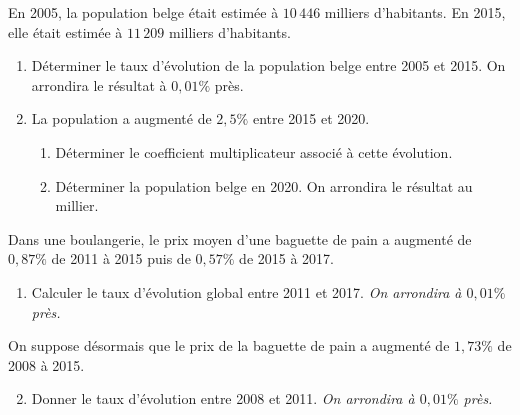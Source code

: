 \documentclass[11pt]{article}
\begin{document}
\begin{exo}
En 2005, la population belge était estimée à $10\,446$ milliers d'habitants. En
2015, elle était estimée à $11\,209$ milliers d'habitants.

\begin{enumerate}
  \item Déterminer le taux d'évolution de la population belge entre 2005 et
    2015. On arrondira le résultat à $0,01 \%$ près.
  \item La population a augmenté de $2,5 \%$ entre 2015 et 2020.
    \begin{enumerate}
      \item Déterminer le coefficient multiplicateur associé à cette évolution.
      \item Déterminer la population belge en 2020. On arrondira le résultat au millier.
    \end{enumerate}
\end{enumerate}
\end{exo}

\begin{exo}
  Dans une boulangerie, le prix moyen d'une baguette de pain a augmenté de $0,87
  \%$ de 2011 à 2015 puis de $0,57 \%$ de 2015 à 2017.
  \begin{enumerate}
    \item Calculer le taux d'évolution global entre 2011 et 2017.
      \emph{On arrondira à $0,01\%$ près.}
  \end{enumerate}
  \noindent On suppose désormais que le prix de la baguette de pain a augmenté
  de $1,73\%$ de 2008 à 2015.
  \begin{enumerate}
      \setcounter{enumi}{1}
    \item Donner le taux d'évolution entre 2008 et 2011.
      \emph{On arrondira à $0,01\%$ près.}
  \end{enumerate}
\end{exo}
\end{document}
